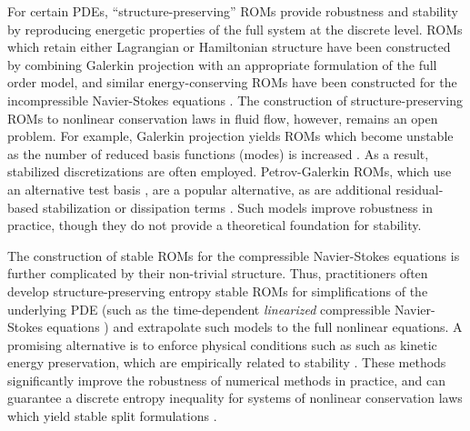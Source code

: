 \documentclass[preprint,10pt]{elsarticle}
\theoremstyle{definition}
\theoremstyle{lemma}
\theoremstyle{theorem}
\theoremstyle{assumption}
\begin{document}
For certain PDEs, ``structure-preserving'' ROMs provide robustness and stability by reproducing energetic properties of the full system at the discrete level.  ROMs which retain either Lagrangian \cite{lall2003structure, carlberg2015preserving} or Hamiltonian structure \cite{benner2012interpolation, gugercin2012structure, peng2016symplectic, chaturantabut2016structure, gong2017structure, afkham2017structure, afkham2018structure} have been constructed by combining Galerkin projection with an appropriate formulation of the full order model, and similar energy-conserving ROMs have been constructed for the incompressible Navier-Stokes equations \cite{farhat2014dimensional, farhat2015structure}.  The construction of structure-preserving ROMs to nonlinear conservation laws in fluid flow, however, remains an open problem.  For example, Galerkin projection yields ROMs which become unstable as the number of reduced basis functions (modes) is increased \cite{bui2007goal, carlberg2013gnat}.  As a result, stabilized discretizations are often employed.  Petrov-Galerkin ROMs, which use an alternative test basis \cite{maday2002blackbox, rozza2007stability, bui2007goal, serre2012reliable, amsallem2012stabilization, rozza2013reduced, ballarin2015supremizer, carlberg2017galerkin}, are a popular alternative, as are additional residual-based stabilization or dissipation terms \cite{wang2012proper, kalashnikova2014stabilization, caiazzo2014numerical, balajewicz2016minimal}.  Such models improve robustness in practice, though they do not provide a theoretical foundation for stability.  

The construction of stable ROMs for the compressible Navier-Stokes equations is further complicated by their non-trivial structure.  Thus, practitioners often develop structure-preserving entropy stable ROMs for simplifications of the underlying PDE (such as the time-dependent \textit{linearized} compressible Navier-Stokes equations \cite{barone2009stable, kalashnikova2010stability, amsallem2012stabilization, kalashnikova2014construction}) and extrapolate such models to the full nonlinear equations.  A promising alternative is to enforce physical conditions such as such as kinetic energy preservation, which are empirically related to stability \cite{maboudi2018conservative}.  These methods significantly improve the robustness of numerical methods in practice, and can guarantee a discrete entropy inequality for systems of nonlinear conservation laws which yield stable split formulations \cite{fisher2013discretely}.  
\end{document}
